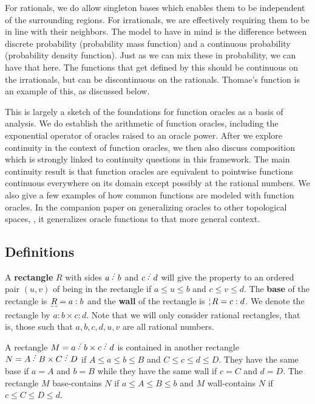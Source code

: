 \documentclass[12pt]{article}
\begin{document}
For rationals, we do allow singleton bases which enables them to be independent of the surrounding regions. For irrationals, we are effectively requiring them to be in line with their neighbors. The model to have in mind is the difference between discrete probability (probability mass function) and a continuous probability (probability density function). Just as we can mix these in probability, we can have that here. The functions that get defined by this should be continuous on the irrationals, but can be discontinuous on the rationals. Thomae's function is an example of this, as discussed below. 

This is largely a sketch of the foundations for function oracles as a basis of analysis. We do establish the arithmetic of function oracles, including the exponential operator of oracles raised to an oracle power. After we explore continuity in the context of function oracles, we then also discuss composition which is strongly linked to continuity questions in this framework. The main continuity result is that function oracles are equivalent to pointwise functions continuous everywhere on its domain except possibly at the rational numbers. We also give a few examples of how common functions are modeled with function oracles. In the companion paper on generalizing oracles to other topological spaces, \cite{taylor23metric}, it generalizes oracle functions to that more general context. 

\subsection{Definitions}

A \textbf{rectangle} $R$ with sides $a \lte b$ and $c \lte d$ will give the property to an ordered pair $(u, v)$ of being in the rectangle if $a \leq u \leq b$ and $c \leq v \leq d$. The \textbf{base} of the rectangle is $\base{R} = a:b$ and the \textbf{wall} of the rectangle is $\wall{R} = c:d$. We denote the rectangle by $a:b \times c:d$. Note that we will only consider rational rectangles, that is, those such that $a, b, c, d, u, v$ are all rational numbers. 

A rectangle $M = a \lte b \times c \lte d$ is contained in another rectangle $N = A \lte B \times C \lte D$ if $A \leq a \leq b \leq B$ and $C \leq c \leq d \leq D$. They have the same base if $a=A$ and $b=B$ while they have the same wall if $c=C$ and $d=D$. The rectangle $M$ base-contains $N$ if $a \leq A \leq B \leq b$ and $M$ wall-contains $N$ if $c \leq C \leq D \leq d$.
\end{document}
